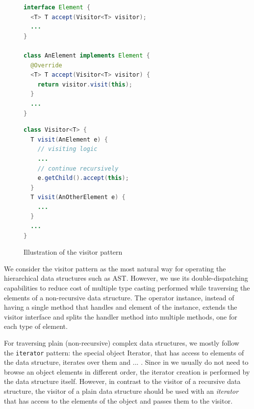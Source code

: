 \begin{figure}[h]
\centering
\begin{minipage}[t]{.55\textwidth}
\begin{lstlisting}[language=java]
interface Element {
  <T> T accept(Visitor<T> visitor);
  ...
}

class AnElement implements Element {
  @Override
  <T> T accept(Visitor<T> visitor) {
    return visitor.visit(this);
  }
  ...
}
\end{lstlisting}
\end{minipage}%
\begin{minipage}[t]{.45\textwidth}
\begin{lstlisting}[language=java]
class Visitor<T> {
  T visit(AnElement e) {
    // visiting logic
    ...
    // continue recursively
    e.getChild().accept(this);
  }
  T visit(AnOtherElement e) {
    ...
  }
  ...
}
\end{lstlisting}
\end{minipage}
\caption{Illustration of the visitor pattern}
\label{fig:visitor}
\end{figure}

We consider the visitor pattern as the most natural way for operating the hierarchical data structures such as AST.
However, we use its double-dispatching capabilities to reduce cost of multiple type casting performed while traversing the elements of a non-recursive data structure.
The operator instance, instead of having a single method that handles and element of the instance, extends the visitor interface and splits the handler method into multiple methods, one for each type of element.

For traversing plain (non-recursive) complex data structures, we mostly follow the \texttt{iterator} pattern: the special object Iterator, that has access to elements of the data structure, iterates over them and ...
. Since in \porthos[] we usually do not need to browse an object elements in different order, the iterator creation is performed by the data structure itself.
However, in contrast to the visitor of a recursive data structure, the visitor of a plain data structure should be used with an \textit{iterator} that has access to the elements of the object and passes them to the visitor.



